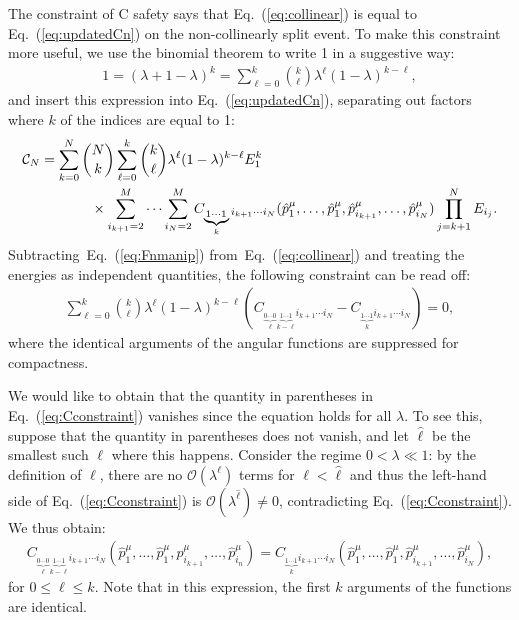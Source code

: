 \documentclass[letterpaper,11pt]{article}
\DeclareRobustCommand{\Eq}[1]{Eq.~(\ref{#1})}
\begin{document}
The constraint of C safety says that \Eq{eq:collinear} is equal to \Eq{eq:updatedCn} on the non-collinearly split event.
%
To make this constraint more useful, we use the binomial theorem to write 1 in a suggestive way:
\begin{align}\label{eq:binomial1}
1=(\lambda+1-\lambda)^k=\sum_{\ell=0}^k\binom{k}{\ell}\lambda^\ell(1-\lambda)^{k-\ell},
\end{align}
and insert this expression into \Eq{eq:updatedCn}, separating out factors where $k$ of the indices are equal to 1:
\begin{align}\label{eq:Fnmanip}
\mathcal C_N&=\sum_{k=0}^N\binom{N}{k}\sum_{\ell=0}^k\binom{k}{\ell}\lambda^\ell(1-\lambda)^{k-\ell}E_1^k\\
&\nonumber\hspace{.5in}\times \sum_{i_{k+1}=2}^M\cdots\sum_{i_N=2}^MC_{\underbrace{{}_{1\cdots1}}_{k}i_{k+1}\cdots i_N}(\hat p_{1}^\mu,\ldots,\hat p_{1}^\mu,\hat p_{i_{k+1}}^\mu,\ldots,\hat p_{i_N}^\mu)\prod_{j=k+1}^NE_{i_j}.
\end{align}
%
Subtracting~\Eq{eq:Fnmanip} from~\Eq{eq:collinear} and treating the energies as independent quantities, the following constraint can be read off:
\begin{align}\label{eq:Cconstraint}
\sum_{\ell=0}^k\binom{k}{\ell}\lambda^\ell(1-\lambda)^{k-\ell}\left(C_{\underbrace{{}_{0\cdots0}}_{\ell}\underbrace{{}_{1\cdots1}}_{k-\ell}i_{k+1}\cdots i_N}-C_{\underbrace{{}_{1\cdots 1}}_{k}i_{k+1}\cdots i_N}\right)=0,
\end{align}
where the identical arguments of the angular functions are suppressed for compactness.  

We would like to obtain that the quantity in parentheses in \Eq{eq:Cconstraint} vanishes since the equation holds for all $\lambda$. 
%
To see this, suppose that the quantity in parentheses does not vanish, and let $\hat\ell$ be the smallest such $\ell$ where this happens.
%
Consider the regime $0<\lambda\ll1$: by the definition of $\hat\ell$, there are no $\mathcal O(\lambda^\ell)$ terms for $\ell<\hat \ell$ and thus the left-hand side of \Eq{eq:Cconstraint} is $\mathcal O(\lambda^{\hat\ell})\neq 0$, contradicting \Eq{eq:Cconstraint}. 
%
We thus obtain:
\begin{align}\label{eq:Cresult}
C_{\underbrace{{}_{0\cdots0}}_{\ell}\underbrace{{}_{1\cdots1}}_{k-\ell}i_{k+1}\cdots i_N}(\hat p_{1}^\mu,\ldots,\hat p_{1}^\mu,\hat p_{i_{k+1}}^\mu,\ldots,\hat p_{i_n}^\mu)=C_{\underbrace{{}_{1\cdots 1}}_{k}i_{k+1}\cdots i_N}(\hat p_{1}^\mu,\ldots,\hat p_{1}^\mu,\hat p_{i_{k+1}}^\mu,\ldots,\hat p_{i_N}^\mu),
\end{align}
for $0\le\ell\le k$.  Note that in this expression, the first $k$ arguments of the functions are identical.
\end{document}
